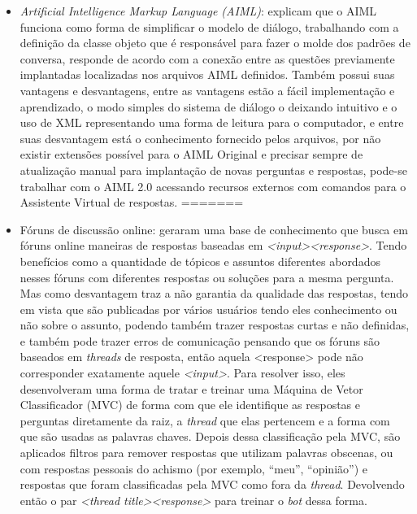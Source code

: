 \documentclass[
	12pt,				%
	oneside,
	a4paper,			%
	english,			%
	french,				%
	spanish,			%
	brazil				%
	]{abntex2}
\begin{document}
\begin{itemize}
	\item \emph{Artificial Intelligence Markup Language (AIML)}: \textcite{AIML} explicam que o AIML funciona como forma de simplificar o modelo de diálogo, trabalhando com a definição da classe objeto que é responsável para fazer o molde dos padrões de conversa, responde de acordo com a conexão entre as questões previamente implantadas localizadas nos arquivos AIML definidos. Também possui suas vantagens e desvantagens, entre as vantagens estão a fácil implementação e aprendizado, o modo simples do sistema de diálogo o deixando intuitivo e o uso de XML representando uma forma de leitura para o computador, e entre suas desvantagem está o conhecimento fornecido pelos arquivos, por não existir extensões possível para o AIML Original e precisar sempre de atualização manual para implantação de novas perguntas e respostas, pode-se trabalhar com o AIML 2.0 acessando recursos externos com comandos para o Assistente Virtual de respostas.
=======
	\item Fóruns de discussão online: \textcite{oline-foruns-database} geraram uma base de conhecimento que busca em fóruns online maneiras de respostas baseadas em \emph{<input><response>}. Tendo benefícios como a quantidade de tópicos e assuntos diferentes abordados nesses fóruns com diferentes respostas ou soluções para a mesma pergunta. Mas como desvantagem traz a não garantia da qualidade das respostas, tendo em vista que são publicadas por vários usuários tendo eles conhecimento ou não sobre o assunto, podendo também trazer respostas curtas e não definidas, e também pode trazer erros de comunicação pensando que os fóruns são baseados em \emph{threads} de resposta, então aquela <response> pode não corresponder exatamente aquele \emph{<input>}. Para resolver isso, eles desenvolveram uma forma de tratar e treinar uma Máquina de Vetor Classificador (MVC) de forma com que ele identifique as respostas e perguntas diretamente da raiz, a \emph{thread} que elas pertencem e a forma com que são usadas as palavras chaves. Depois dessa classificação pela MVC, são aplicados filtros para remover respostas que utilizam palavras obscenas, ou com respostas pessoais do achismo (por exemplo, “meu”, “opinião”) e respostas que foram classificadas pela MVC como fora da \emph{thread}. Devolvendo então o par \emph{<thread title><response>} para treinar o \emph{bot} dessa forma.


\end{itemize}
\end{document}
